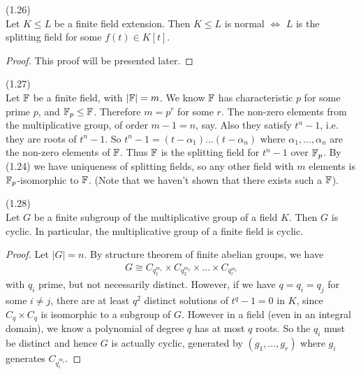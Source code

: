 \documentclass[a4paper]{article}
\begin{document}
\begin{thm} (1.26)\\
Let $K \leq L$ be a finite field extension. Then $K \leq L$ is normal $\iff$ $L$ is the splitting field for some $f(t) \in K[t]$.
\begin{proof}
This proof will be presented later.
\end{proof}
\end{thm}

\begin{eg} (1.27)\\
Let $\mathbb{F}$ be a finite field, with $|\mathbb{F}| = m$. We know $\mathbb{F}$ has characteristic $p$ for some prime $p$, and $\mathbb{F}_p \leq \mathbb{F}$. Therefore $m=p^r$ for some $r$. The non-zero elements from the multiplicative group, of order $m-1=n$, say. Also they satisfy $t^n-1$, i.e. they are roots of $t^n-1$. So $t^n-1 = (t-\alpha_1)...(t-\alpha_n)$ where $\alpha_1,...,\alpha_n$ are the non-zero elements of $\mathbb{F}$. Thus $\mathbb{F}$ is the splitting field for $t^n-1$ over $\mathbb{F}_p$. By (1.24) we have uniqueness of splitting fields, so any other field with $m$ elements is $\mathbb{F}_p$-isomorphic to $\mathbb{F}$. (Note that we haven't shown that there exists such a $\mathbb{F}$).
\end{eg}

\begin{thm} (1.28)\\
Let $G$ be a finite subgroup of the multiplicative group of a field $K$. Then $G$ is cyclic. In particular, the multiplicative group of a finite field is cyclic.
\begin{proof}
Let $|G|=n$. By structure theorem of finite abelian groups, we have
\begin{equation*}
\begin{aligned}
G \cong C_{q_1^{m_1}} \times C_{q_2^{m_2}} \times ... \times C_{q_r^{m_r}}
\end{aligned}
\end{equation*}
with $q_i$ prime, but not necessarily distinct. However, if we have $q=q_i = q_j$ for some $i \neq j$, there are at least $q^2$ distinct solutions of $t^q-1=0$ in $K$, since $C_q \times C_q$ is isomorphic to a subgroup of $G$. However in a field (even in an integral domain), we know a polynomial of degree $q$ has at most $q$ roots. So the $q_i$ must be distinct and hence $G$ is actually cyclic, generated by $(g_1,...,g_r)$ where $g_i$ generates $C_{q_i^{m_i}}$.
\end{proof}
\end{thm}

\newpage
\end{document}
